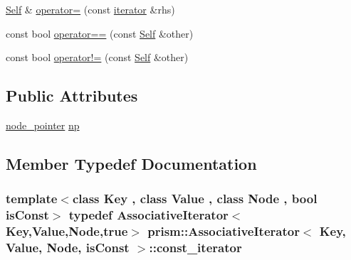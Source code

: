 \begin{DoxyCompactItemize}
\item 
\hyperlink{structprism_1_1_associative_iterator_acec023aedf7a8097250179b1de84d78d}{Self} \& \hyperlink{structprism_1_1_associative_iterator_a1ff6e793e83d8008121ebd5d864a43d8}{operator=} (const \hyperlink{structprism_1_1_associative_iterator_a1c18ef8b4a02324bfdbf541b023ecc6b}{iterator} \&rhs)
\item 
const bool \hyperlink{structprism_1_1_associative_iterator_a4bc7b60448c2a982b29f0742218271bb}{operator==} (const \hyperlink{structprism_1_1_associative_iterator_acec023aedf7a8097250179b1de84d78d}{Self} \&other)
\item 
const bool \hyperlink{structprism_1_1_associative_iterator_aa697ef95776d617daa0a87e7ec96e624}{operator!=} (const \hyperlink{structprism_1_1_associative_iterator_acec023aedf7a8097250179b1de84d78d}{Self} \&other)
\end{DoxyCompactItemize}
\subsection*{Public Attributes}
\begin{DoxyCompactItemize}
\item 
\hyperlink{structprism_1_1_associative_iterator_a73a0ddce41b285bf48fb0ef3411f6557}{node\+\_\+pointer} \hyperlink{structprism_1_1_associative_iterator_a5a71d66646a56ad2d60e2db2b881061b}{np}
\end{DoxyCompactItemize}


\subsection{Member Typedef Documentation}
\subsubsection[{\texorpdfstring{const\+\_\+iterator}{const_iterator}}]{\setlength{\rightskip}{0pt plus 5cm}template$<$class Key , class Value , class Node , bool is\+Const$>$ typedef {\bf Associative\+Iterator}$<$Key,Value,Node,true$>$ {\bf prism\+::\+Associative\+Iterator}$<$ Key, Value, Node, is\+Const $>$\+::{\bf const\+\_\+iterator}}\hypertarget{structprism_1_1_associative_iterator_ab372de0dedeecc03d00f577af3380ef2}{}\label{structprism_1_1_associative_iterator_ab372de0dedeecc03d00f577af3380ef2}
